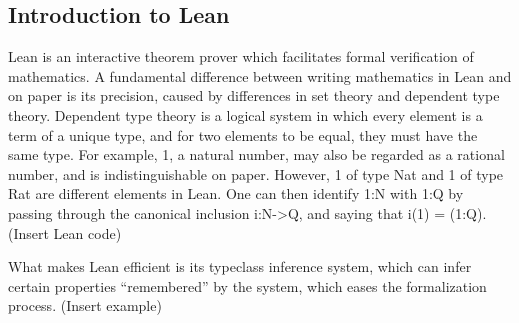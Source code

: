 \documentclass[12pt,reqno,oneside]{amsart}
\begin{document}



\subsection{Introduction to Lean}
Lean is an interactive theorem prover which facilitates formal verification of mathematics. A fundamental difference between writing mathematics in Lean and on paper is its precision, caused by differences in set theory and dependent type theory. Dependent type theory is a logical system in which every element is a term of a unique type, and for two elements to be equal, they must have the same type. For example, 1, a natural number, may also be regarded as a rational number, and is indistinguishable on paper. However, 1 of type Nat and 1 of type Rat are different elements in Lean. One can then identify 1:N with 1:Q by passing through the canonical inclusion i:N->Q, and saying that i(1) = (1:Q). (Insert Lean code)

What makes Lean efficient is its typeclass inference system, which can infer certain properties “remembered” by the system, which eases the formalization process. (Insert example)
\end{document}
